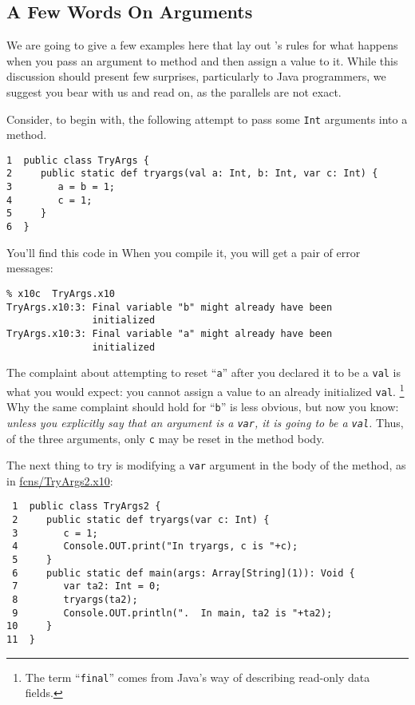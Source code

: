 \subsection{A Few Words On Arguments}
We are going
to give a few examples here that lay out \Xten's rules for what happens when you pass
an argument to method and then assign a value to it.  While this discussion should present
few surprises, particularly to Java programmers, we suggest you bear with us and read on,
as the parallels are not exact.

Consider, to begin with, the following attempt to pass some {\tt Int} arguments into a method.
\begin{verbatim}
1  public class TryArgs {
2     public static def tryargs(val a: Int, b: Int, var c: Int) {
3        a = b = 1;  
4        c = 1;       
5     }
6  }
\end{verbatim}
You'll find this code in 
When you compile it, you will get a pair of error messages:
\begin{verbatim}
% x10c  TryArgs.x10
TryArgs.x10:3: Final variable "b" might already have been
               initialized
TryArgs.x10:3: Final variable "a" might already have been
               initialized
\end{verbatim}
The complaint about attempting to reset ``{\tt a}'' after you declared it to be a
{\tt val} is what you would expect: you cannot assign a value to an already initialized
 {\tt val}.
 \footnote{
 The term ``{\tt final}'' comes from Java's way of describing read-only
 data fields.
 }
Why the same complaint should hold for ``{\tt b}'' is less
obvious, but now you know: {\em unless you explicitly say that an argument is a {\tt var}, it is
going to be a {\tt val}.}   Thus, of the three arguments, only {\tt c} may be reset in the
method body.

The next thing to try is modifying a {\tt var} argument in the body of the method, as in 
\href{http://dist.codehaus.org/x10/documentation/guide/src/fcns/TryArgs2.x10}{fcns/TryArgs2.x10}: 
\begin{verbatim}
 1  public class TryArgs2 {
 2     public static def tryargs(var c: Int) {
 3        c = 1;   
 4        Console.OUT.print("In tryargs, c is "+c);
 5     }
 6     public static def main(args: Array[String](1)): Void {
 7        var ta2: Int = 0;
 8        tryargs(ta2);
 9        Console.OUT.println(".  In main, ta2 is "+ta2);     
10     }
11  }
\end{verbatim}
